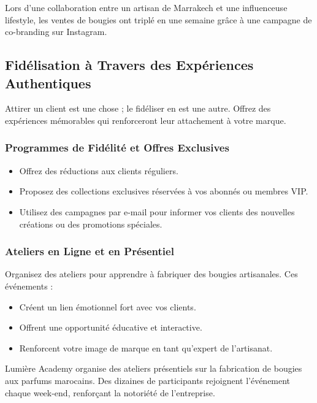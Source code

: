 \documentclass[11pt,fleqn,onecolumn,oneside]{book}
\begin{document}
\begin{example}
Lors d’une collaboration entre un artisan de Marrakech et une influenceuse lifestyle, les ventes de bougies ont triplé en une semaine grâce à une campagne de co-branding sur Instagram.
\end{example}

\subsection*{Fidélisation à Travers des Expériences Authentiques}

Attirer un client est une chose ; le fidéliser en est une autre. Offrez des expériences mémorables qui renforceront leur attachement à votre marque.

\subsubsection*{Programmes de Fidélité et Offres Exclusives}

\begin{itemize}
    \item Offrez des réductions aux clients réguliers.
    \item Proposez des collections exclusives réservées à vos abonnés ou membres VIP.
    \item Utilisez des campagnes par e-mail pour informer vos clients des nouvelles créations ou des promotions spéciales.
\end{itemize}

\subsubsection*{Ateliers en Ligne et en Présentiel}

Organisez des ateliers pour apprendre à fabriquer des bougies artisanales. Ces événements :
\begin{itemize}
    \item Créent un lien émotionnel fort avec vos clients.
    \item Offrent une opportunité éducative et interactive.
    \item Renforcent votre image de marque en tant qu’expert de l’artisanat.
\end{itemize}

\begin{example}
Lumière Academy organise des ateliers présentiels sur la fabrication de bougies aux parfums marocains. Des dizaines de participants rejoignent l'événement chaque week-end, renforçant la notoriété de l'entreprise.
\end{example}
\end{document}
